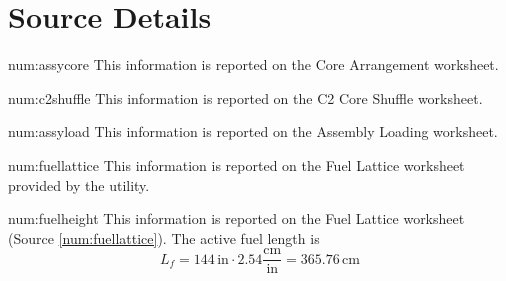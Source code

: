 \clearpage
\pagestyle{plain}
{}



\clearpage
{}
{}
\section*{Source Details}

\begin{numitem}{num:assycore}
  This information is reported on the Core Arrangement worksheet.
\end{numitem}

\begin{numitem}{num:c2shuffle}
  This information is reported on the C2 Core Shuffle worksheet.
\end{numitem}

\begin{numitem}{num:assyload}
  This information is reported on the Assembly Loading worksheet.
\end{numitem}

\begin{numitem}{num:fuellattice}
  This information is reported on the Fuel Lattice worksheet provided by the utility.
\end{numitem}

\begin{numitem}{num:fuelheight}
  This information is reported on the Fuel Lattice worksheet (Source \ref{num:fuellattice}). The active fuel length is
\[
    L_{f} = 144\,\mathrm{in} \cdot 2.54 \mathrm{\frac{cm}{in}} = 365.76\,\mathrm{cm}
\] 
\end{numitem}

